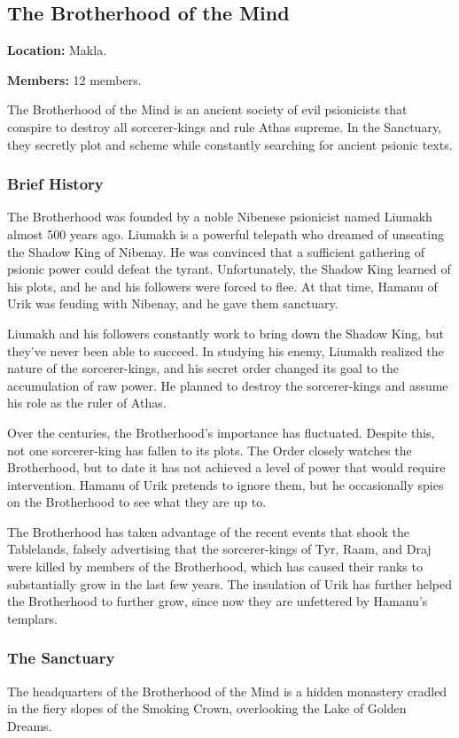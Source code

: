 \subsection{The Brotherhood of the Mind}
\textbf{Location:} Makla.

\textbf{Members:} 12 members.

The Brotherhood of the Mind is an ancient society of evil psionicists that conspire to destroy all sorcerer-kings and rule Athas supreme. In the Sanctuary, they secretly plot and scheme while constantly searching for ancient psionic texts.

\subsubsection{Brief History}
The Brotherhood was founded by a noble Nibenese psionicist named Liumakh almost 500 years ago. Liumakh is a powerful telepath who dreamed of unseating the Shadow King of Nibenay. He was convinced that a sufficient gathering of psionic power could defeat the tyrant. Unfortunately, the Shadow King learned of his plots, and he and his followers were forced to flee. At that time, Hamanu of Urik was feuding with Nibenay, and he gave them sanctuary.

Liumakh and his followers constantly work to bring down the Shadow King, but they've never been able to succeed. In studying his enemy, Liumakh realized the nature of the sorcerer-kings, and his secret order changed its goal to the accumulation of raw power. He planned to destroy the sorcerer-kings and assume his role as the ruler of Athas.

Over the centuries, the Brotherhood's importance has fluctuated. Despite this, not one sorcerer-king has fallen to its plots. The Order closely watches the Brotherhood, but to date it has not achieved a level of power that would require intervention. Hamanu of Urik pretends to ignore them, but he occasionally spies on the Brotherhood to see what they are up to.

The Brotherhood has taken advantage of the recent events that shook the Tablelands, falsely advertising that the sorcerer-kings of Tyr, Raam, and Draj were killed by members of the Brotherhood, which has caused their ranks to substantially grow in the last few years. The insulation of Urik has further helped the Brotherhood to further grow, since now they are unfettered by Hamanu's templars.

\subsubsection{The Sanctuary}
The headquarters of the Brotherhood of the Mind is a hidden monastery cradled in the fiery slopes of the Smoking Crown, overlooking the Lake of Golden Dreams.

